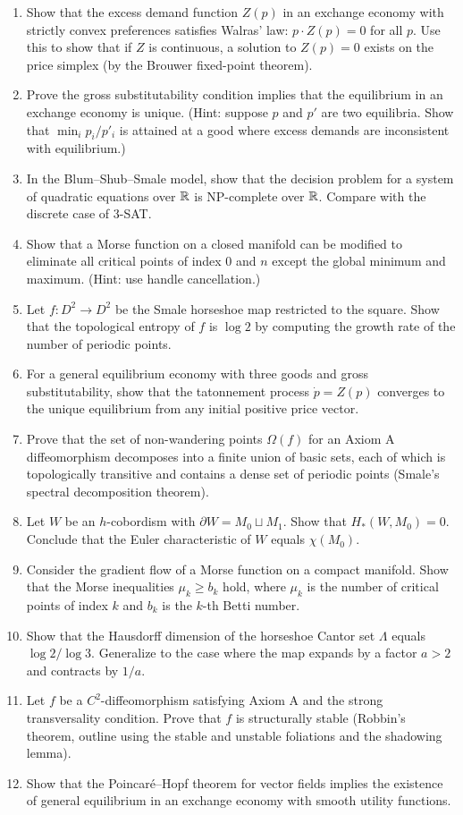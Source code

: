 \begin{enumerate}
    \item [I] Show that the excess demand function \(Z(p)\) in an exchange economy with strictly convex preferences satisfies Walras' law: \(p \cdot Z(p) = 0\) for all \(p\). Use this to show that if \(Z\) is continuous, a solution to \(Z(p) = 0\) exists on the price simplex (by the Brouwer fixed-point theorem).
    \item [I] Prove the gross substitutability condition implies that the equilibrium in an exchange economy is unique. (Hint: suppose \(p\) and \(p'\) are two equilibria. Show that \(\min_i p_i/p'_i\) is attained at a good where excess demands are inconsistent with equilibrium.)
    \item [A] In the Blum--Shub--Smale model, show that the decision problem for a system of quadratic equations over \(\mathbb{R}\) is NP-complete over \(\mathbb{R}\). Compare with the discrete case of 3-SAT.
    \item [I] Show that a Morse function on a closed manifold can be modified to eliminate all critical points of index 0 and \(n\) except the global minimum and maximum. (Hint: use handle cancellation.)
    \item [I] Let \(f: D^2 \to D^2\) be the Smale horseshoe map restricted to the square. Show that the topological entropy of \(f\) is \(\log 2\) by computing the growth rate of the number of periodic points.
    \item [I] For a general equilibrium economy with three goods and gross substitutability, show that the tatonnement process \(\dot{p} = Z(p)\) converges to the unique equilibrium from any initial positive price vector.
    \item [I] Prove that the set of non-wandering points \(\Omega(f)\) for an Axiom A diffeomorphism decomposes into a finite union of basic sets, each of which is topologically transitive and contains a dense set of periodic points (Smale's spectral decomposition theorem).
    \item [I] Let \(W\) be an \(h\)-cobordism with \(\partial W = M_0 \sqcup M_1\). Show that \(H_*(W, M_0) = 0\). Conclude that the Euler characteristic of \(W\) equals \(\chi(M_0)\).
    \item [B] Consider the gradient flow of a Morse function on a compact manifold. Show that the Morse inequalities \(\mu_k \geq b_k\) hold, where \(\mu_k\) is the number of critical points of index \(k\) and \(b_k\) is the \(k\)-th Betti number.
    \item [I] Show that the Hausdorff dimension of the horseshoe Cantor set \(\Lambda\) equals \(\log 2 / \log 3\). Generalize to the case where the map expands by a factor \(a > 2\) and contracts by \(1/a\).
    \item [A] Let \(f\) be a \(C^2\)-diffeomorphism satisfying Axiom A and the strong transversality condition. Prove that \(f\) is structurally stable (Robbin's theorem, outline using the stable and unstable foliations and the shadowing lemma).
    \item [I] Show that the Poincar\'e--Hopf theorem for vector fields implies the existence of general equilibrium in an exchange economy with smooth utility functions.
\end{enumerate}

